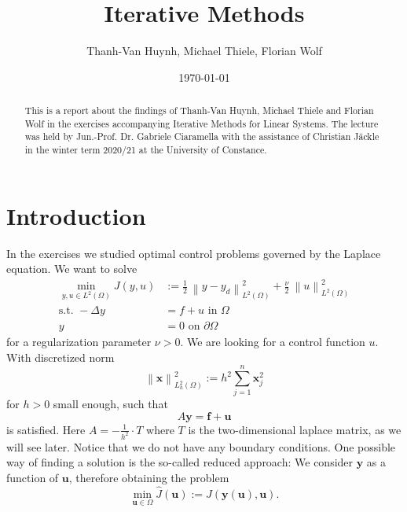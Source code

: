 \documentclass{amsart}
\theoremstyle{definition}
\theoremstyle{remark}
\numberwithin{equation}{section}
\renewcommand{\vec}{\textbf}
\newcommand{\norm}[1]{\left\lVert#1\right\rVert}
\begin{document}
\title{Iterative Methods}

\author{Thanh-Van Huynh, Michael Thiele, Florian Wolf}
\date{\today}


\begin{abstract}
This is a report about the findings of Thanh-Van Huynh, Michael Thiele and Florian Wolf in the exercises accompanying Iterative Methods for Linear Systems. The lecture was held by Jun.-Prof. Dr. Gabriele Ciaramella with the assistance of Christian J\"ackle in the winter term 2020/21 at the University of Constance.
\end{abstract}

\maketitle

\tableofcontents



\section{Introduction}
In the exercises we studied optimal control problems governed by the Laplace equation. We want to solve
\begin{align}
\min\limits_{y,u\in L^2(\Omega)} J(y,u) &:= \frac{1}{2}\ \norm{y-y_d}
_{L^2(\Omega)}^2 + \frac{\nu}{2}\ \norm{u}_{L^2(\Omega)}^2\\
\text{s.t. } -\Delta y &= f+ u \text{ in } \Omega\\
y &= 0 \text{ on } \partial\Omega
\end{align}
for a regularization parameter $\nu > 0$. We are looking for a control function $u$. With discretized norm
\begin{equation*}
\norm{\vec{x}}_{L_h^2(\Omega)}^2 := h^2 \sum\limits_{j=1}^n \vec{x}_j^2
\end{equation*}
for $h>0$ small enough, such that
\begin{equation*}
A\vec{y}=\vec{f}+\vec{u}
\end{equation*}
is satisfied. Here $A = -\frac{1}{h^2}\cdot T$ where $T$ is the two-dimensional laplace matrix, as we will see later. Notice that we do not have any boundary conditions. One possible way of finding a solution is the so-called reduced approach: We consider $\vec{y}$ as a function of $\vec{u}$, therefore obtaining the problem
\begin{equation*}
\min\limits_{\vec{u}\in\Omega} \hat{J}(\vec{u}) := J(\vec{y}(\vec{u}),\vec{u}).
\end{equation*}
\end{document}
